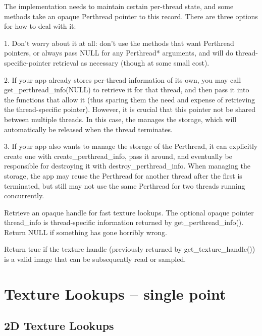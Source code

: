 The \TextureSystem implementation needs to maintain certain per-thread
state, and some \TextureSystem methods take an opaque {\cf Perthread} pointer
to this record. There are three options for how to deal with it:

1. Don't worry about it at all: don't use the methods that want {\cf
Perthread} pointers, or always pass {\cf NULL} for any {\cf Perthread*}
arguments, and \TextureSystem will do thread-specific-pointer retrieval as
necessary (though at some small cost).

2. If your app already stores per-thread information of its own, you may
call {\cf get_perthread_info(NULL)} to retrieve it for that thread, and then
pass it into the functions that allow it (thus sparing them the need and
expense of retrieving the thread-specific pointer). However, it is crucial
that this pointer not be shared between multiple threads. In this case,
the \TextureSystem manages the storage, which will automatically be released
when the thread terminates.

3. If your app also wants to manage the storage of the {\cf Perthread},
it can explicitly create one with {\cf create_perthread_info}, pass it around,
and eventually be responsible for destroying it with {\cf destroy_perthread_info}.
When managing the storage, the app may reuse the {\cf Perthread} for another
thread after the first is terminated, but still may not use the same
{\cf Perthread} for two threads running concurrently.
\apiend


Retrieve an opaque handle for fast texture lookups.  The optional opaque
pointer {\cf thread_info} is thread-specific information returned by
{\cf get_perthread_info()}.  Return {\cf NULL} if something has gone
horribly wrong.
\apiend

Return true if the texture handle (previously returned by
{\cf get_texture_handle()}) is a valid image that can be subsequently read
or sampled.
\apiend


\newpage
\section{Texture Lookups -- single point}

\subsection{2D Texture Lookups}
\label{sec:texturesys:api:texture}


